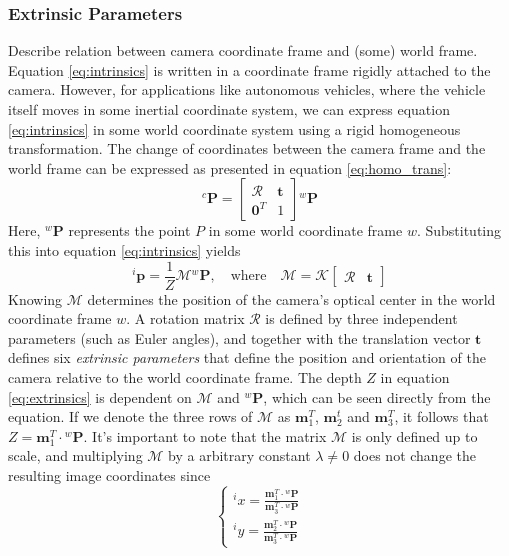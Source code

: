 \subsubsection{Extrinsic Parameters}
Describe relation between camera coordinate frame and (some) world frame.
Equation \ref{eq:intrinsics} is written in a coordinate frame rigidly attached to the camera. However, for applications like autonomous vehicles, where the vehicle itself moves in some inertial coordinate system, we can express equation \ref{eq:intrinsics} in some world coordinate system using a rigid homogeneous transformation. The change of coordinates between the camera frame and the world frame can be expressed as presented in equation \ref{eq:homo_trans}:
\begin{equation}
    ^c\mathbf{P}=\begin{bmatrix}\mathcal{R} & \mathbf{t}\\ \mathbf{0}^T & 1\end{bmatrix} {}^w\mathbf{P}
\end{equation}
Here, $^w\mathbf{P}$ represents the point $P$ in some world coordinate frame $w$. Substituting this into equation \ref{eq:intrinsics} yields
\begin{equation}
\label{eq:extrinsics}
    ^i\mathbf{p}=\frac{1}{Z}\mathcal{M}{}^w\mathbf{P},\quad \text{where}\quad \mathcal{M}=\mathcal{K}\begin{bmatrix}\mathcal{R} & \mathbf{t}\end{bmatrix}
\end{equation}
Knowing $\mathcal{M}$ determines the position of the camera's optical center in the world coordinate frame $w$. A rotation matrix $\mathcal{R}$ is defined by three independent parameters (such as Euler angles), and together with the translation vector $\mathbf{t}$ defines six \textit{extrinsic parameters} that define the position and orientation of the camera relative to the world coordinate frame. The depth $Z$ in equation \ref{eq:extrinsics} is dependent on $\mathcal{M}$ and $^w\mathbf{P}$, which can be seen directly from the equation. If we denote the three rows of $\mathcal{M}$ as $\mathbf{m}_1^T$, $\mathbf{m}_2^t$ and $\mathbf{m}_3^T$, it follows that $Z=\mathbf{m}_1^T\cdot {}^w\mathbf{P}$. It's important to note that the matrix $\mathcal{M}$ is only defined up to scale, and multiplying $\mathcal{M}$ by a arbitrary constant $\lambda\neq0$ does not change the resulting image coordinates since
\begin{equation}
\begin{cases}
    {}^i x=\frac{\mathbf{m}_1^T\cdot {}^w\mathbf{P}}{\mathbf{m}_3^T\cdot {}^w\mathbf{P}}\\
    {}^i y=\frac{\mathbf{m}_2^T\cdot {}^w\mathbf{P}}{\mathbf{m}_3^T\cdot {}^w\mathbf{P}}
\end{cases}
\end{equation}
